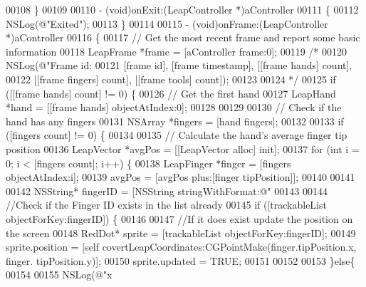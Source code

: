 \begin{DoxyCode}
00108 \}
00109 
00110 - (void)onExit:(LeapController *)aController
00111 \{
00112     NSLog(\textcolor{stringliteral}{@"Exited"});
00113 \}
00114 
00115 - (void)onFrame:(LeapController *)aController
00116 \{
00117     \textcolor{comment}{// Get the most recent frame and report some basic information}
00118     LeapFrame *frame = [aController frame:0];
00119     \textcolor{comment}{/*}
00120 \textcolor{comment}{    NSLog(@"Frame id: %
00121 \textcolor{comment}{          [frame id], [frame timestamp], [[frame hands] count],}
00122 \textcolor{comment}{          [[frame fingers] count], [[frame tools] count]);}
00123 \textcolor{comment}{    }
00124 \textcolor{comment}{     */}
00125     \textcolor{keywordflow}{if} ([[frame hands] count] != 0) \{
00126         \textcolor{comment}{// Get the first hand}
00127         LeapHand *hand = [[frame hands] objectAtIndex:0];
00128 
00129         
00130         \textcolor{comment}{// Check if the hand has any fingers}
00131         NSArray *fingers = [hand fingers];
00132         
00133         \textcolor{keywordflow}{if} ([fingers count] != 0) \{
00134             
00135             \textcolor{comment}{// Calculate the hand's average finger tip position}
00136             LeapVector *avgPos = [[LeapVector alloc] init];
00137             \textcolor{keywordflow}{for} (\textcolor{keywordtype}{int} i = 0; i < [fingers count]; i++) \{
00138                 LeapFinger *finger = [fingers objectAtIndex:i];
00139                 avgPos = [avgPos plus:[finger tipPosition]];
00140                 
00141                 
00142                 NSString* fingerID = [NSString stringWithFormat:@"%
00143                 
00144                 \textcolor{comment}{//Check if the Finger ID exists in the list already}
00145                 \textcolor{keywordflow}{if} ([trackableList objectForKey:fingerID]) \{
00146                     
00147                     \textcolor{comment}{//If it does exist update the position on the screen}
00148                     RedDot* sprite = [trackableList objectForKey:fingerID];
00149                     sprite.position = [\textcolor{keyword}{self} covertLeapCoordinates:CGPointMake(finger.tipPosition.x, finger.
      tipPosition.y)];
00150                     sprite.updated = TRUE;
00151                     
00152                     
00153                 \}\textcolor{keywordflow}{else}\{
00154                     
00155                     NSLog(\textcolor{stringliteral}{@"x %
}}
\end{DoxyCode}
